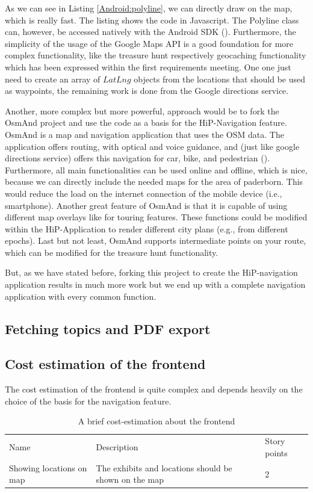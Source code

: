 As we can see in Listing \ref{Android:polyline}, we can directly draw on the map, which is really fast. The listing shows the code in Javascript. The Polyline class can, however, be accessed natively with the Android SDK (\cite{GooglePolylineNative}). Furthermore, the simplicity of the usage of the Google Maps API is a good foundation for more complex functionality, like the treasure hunt respectively geocaching functionality which has been expressed within the first requirements meeting. One one just need to create an array of $LatLng$ objects from the locations that should be used as waypoints, the remaining work is done from the Google directions service.  

Another, more complex but more powerful, approach would be to fork the \ac{OsmAnd} project and use the code as a basis for the HiP-Navigation feature. \ac{OsmAnd} is a map and navigation application that uses the \ac{OSM} data. The application offers routing, with optical and voice guidance, and (just like google directions service) offers this navigation for car, bike, and pedestrian (\cite{osmand}). Furthermore, all main functionalities can be used online and offline, which is nice, because we can directly include the needed maps for the area of paderborn. This would reduce the load on the internet connection of the mobile device (i.e., smartphone). Another great feature of \ac{OsmAnd} is that it is capable of using different map overlays like for touring features. These functions could be modified within the HiP-Application to render different city plans (e.g., from different epochs). Last but not least, \ac{OsmAnd} supports intermediate points on your route, which can be modified for the treasure hunt functionality.


But, as we have stated before, forking this project to create the \ac{HiP}-navigation application results in much more work but we end up with a complete navigation application with every common function. 

\subsection{Fetching topics and PDF export}


\subsection{Cost estimation of the frontend}	
The cost estimation of the frontend is quite complex and depends heavily on the choice of the basis for the navigation feature. 

 \begin{table}[th]
\scriptsize
 \caption{A brief cost-estimation about the frontend}
 \begin{tabular}{lll}
	\toprule
  	Name & Description & Story points \\ 
	\cmidrule(rl){1-1}\cmidrule(rl){2-2}\cmidrule(rl){3-3}
	Showing locations on map	&	The exhibits and locations should be shown on the map			&	2 \\	
	\bottomrule
 \end{tabular}
 \label{tab:costFrontend}
 \end{table} 
